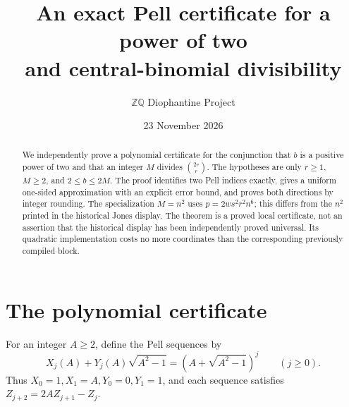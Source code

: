 \documentclass[11pt]{article}
\title{An exact Pell certificate for a power of two\\and central-binomial divisibility}
\author{\(\mathbb Z\mathbb Q\) Diophantine Project}
\date{23 November 2026}
\begin{document}
\maketitle
\begin{abstract}
We independently prove a polynomial certificate for the conjunction
that \(b\) is a positive power of two and that an integer \(M\)
divides \(\binom{2r}{r}\).  The hypotheses are only
\(r\ge1\), \(M\ge2\), and \(2\le b\le2M\).
The proof identifies two Pell indices exactly, gives a uniform
one-sided approximation with an explicit error bound, and proves
both directions by integer rounding.  The specialization \(M=n^2\)
uses \(p=2ws^2r^2n^6\); this differs from the \(n^2\) printed
in the historical Jones display.  The theorem is a proved local
certificate, not an assertion that the historical display has been
independently proved universal.  Its quadratic implementation costs
no more coordinates than the corresponding previously compiled block.
\end{abstract}

\section{The polynomial certificate}

For an integer \(A\ge2\), define the Pell sequences by
\[
 X_j(A)+Y_j(A)\sqrt{A^2-1}
       =(A+\sqrt{A^2-1})^j\qquad(j\ge0).
\]
Thus \(X_0=1,X_1=A,Y_0=0,Y_1=1\), and each sequence
satisfies \(Z_{j+2}=2AZ_{j+1}-Z_j\).
\end{document}
